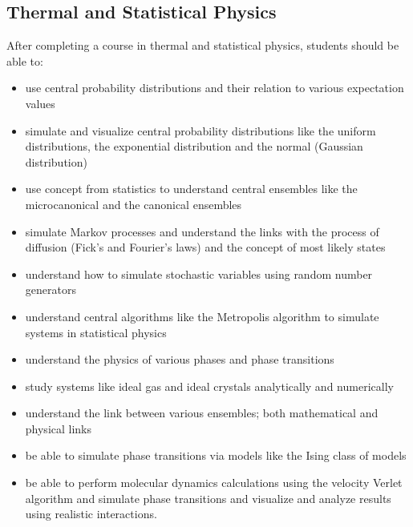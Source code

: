 \documentclass[graybox,envcountchap,sectrefs]{svmult}
\begin{document}
\subsection{Thermal and Statistical Physics}
After completing a course in thermal and statistical physics, students should be able to:
\begin{itemize}
\item use central probability distributions and their relation to various expectation values

\item simulate and visualize central probability distributions like the uniform distributions, the exponential distribution and the normal (Gaussian distribution)

\item use concept from statistics to understand central ensembles like the microcanonical and the canonical ensembles

\item simulate Markov processes and understand the links with the process of diffusion (Fick's and Fourier's laws) and the concept of most likely states

\item understand how to simulate stochastic variables using random number generators

\item understand central algorithms like the Metropolis algorithm to simulate systems in statistical physics

\item understand the physics of various phases and phase transitions

\item study systems like ideal gas and ideal crystals analytically and numerically

\item understand the link between various ensembles; both mathematical and physical links

\item be able to simulate phase transitions via models like the Ising class of models

\item be able to perform molecular dynamics calculations using the velocity Verlet algorithm and simulate phase transitions and visualize and analyze results using realistic interactions.
\end{itemize}
\end{document}
